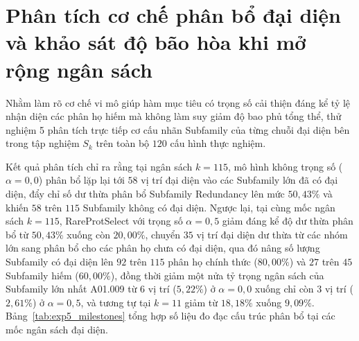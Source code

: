 \FloatBarrier\section{Phân tích cơ chế phân bổ đại diện và khảo sát độ bão hòa khi mở rộng ngân sách}
\label{sec:allocation_saturation_discussion}
\label{sec:branch_5}
\label{subsec:branch5_invariants}
\label{subsec:branch5_results}

Nhằm làm rõ cơ chế vi mô giúp hàm mục tiêu có trọng số cải thiện đáng kể tỷ lệ nhận diện các phân họ hiếm mà không làm suy giảm độ bao phủ tổng thể, thử nghiệm 5 phân tích trực tiếp cơ cấu nhãn Subfamily của từng chuỗi đại diện bên trong tập nghiệm $S_k$ trên toàn bộ $120$ cấu hình thực nghiệm.

Kết quả phân tích chỉ ra rằng tại ngân sách $k = 115$, mô hình không trọng số ($\alpha = 0{,}0$) phân bổ lặp lại tới $58$ vị trí đại diện vào các Subfamily lớn đã có đại diện, đẩy chỉ số dư thừa phân bổ Subfamily Redundancy lên mức $50{,}43\%$ và khiến $58$ trên $115$ Subfamily không có đại diện. Ngược lại, tại cùng mốc ngân sách $k = 115$, RareProtSelect với trọng số $\alpha = 0{,}5$ giảm đáng kể độ dư thừa phân bổ từ $50{,}43\%$ xuống còn $20{,}00\%$, chuyển $35$ vị trí đại diện dư thừa từ các nhóm lớn sang phân bổ cho các phân họ chưa có đại diện, qua đó nâng số lượng Subfamily có đại diện lên $92$ trên $115$ phân họ chính thức ($80{,}00\%$) và $27$ trên $45$ Subfamily hiếm ($60{,}00\%$), đồng thời giảm một nửa tỷ trọng ngân sách của Subfamily lớn nhất A01.009 từ $6$ vị trí ($5{,}22\%$) ở $\alpha = 0{,}0$ xuống chỉ còn $3$ vị trí ($2{,}61\%$) ở $\alpha = 0{,}5$, và tương tự tại $k = 11$ giảm từ $18{,}18\%$ xuống $9{,}09\%$. Bảng~\ref{tab:exp5_milestones} tổng hợp số liệu đo đạc cấu trúc phân bổ tại các mốc ngân sách đại diện.

